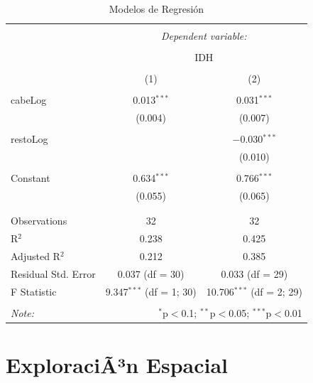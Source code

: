 \documentclass{article}
\begin{document}
\begin{table}[!htbp] \centering 
  \caption{Modelos de Regresión} 
  \label{regresiones} 
\begin{tabular}{@{\extracolsep{5pt}}lcc} 
\\[-1.8ex]\hline 
\hline \\[-1.8ex] 
 & \multicolumn{2}{c}{\textit{Dependent variable:}} \\ 
\cline{2-3} 
\\[-1.8ex] & \multicolumn{2}{c}{IDH} \\ 
\\[-1.8ex] & (1) & (2)\\ 
\hline \\[-1.8ex] 
 cabeLog & 0.013$^{***}$ & 0.031$^{***}$ \\ 
  & (0.004) & (0.007) \\ 
  & & \\ 
 restoLog &  & $-$0.030$^{***}$ \\ 
  &  & (0.010) \\ 
  & & \\ 
 Constant & 0.634$^{***}$ & 0.766$^{***}$ \\ 
  & (0.055) & (0.065) \\ 
  & & \\ 
\hline \\[-1.8ex] 
Observations & 32 & 32 \\ 
R$^{2}$ & 0.238 & 0.425 \\ 
Adjusted R$^{2}$ & 0.212 & 0.385 \\ 
Residual Std. Error & 0.037 (df = 30) & 0.033 (df = 29) \\ 
F Statistic & 9.347$^{***}$ (df = 1; 30) & 10.706$^{***}$ (df = 2; 29) \\ 
\hline 
\hline \\[-1.8ex] 
\textit{Note:}  & \multicolumn{2}{r}{$^{*}$p$<$0.1; $^{**}$p$<$0.05; $^{***}$p$<$0.01} \\ 
\end{tabular} 
\end{table} 






\section{ExploraciÃ³n Espacial}
\end{document}
